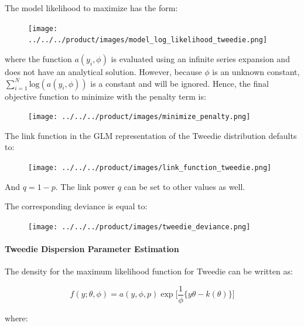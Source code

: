 The model likelihood to maximize has the form:

\begin{figure}[H]
\centering
\texttt{[image: ../../../product/images/model\_log\_likelihood\_tweedie.png]}
\end{figure}

where the function $a(y_i,\phi)$ is evaluated using an infinite series expansion and does not have an analytical solution. However, because $\phi$ is an unknown constant, $\sum_{i=1}^N\text{log}(a(y_i,\phi))$ is a constant and will be ignored. Hence, the final objective function to minimize with the penalty term is:

\begin{figure}[H]
\centering
\texttt{[image: ../../../product/images/minimize\_penalty.png]}
\end{figure}

The link function in the GLM representation of the Tweedie distribution defaults to:

\begin{figure}[H]
\centering
\texttt{[image: ../../../product/images/link\_function\_tweedie.png]}
\end{figure}

And $q = 1 - p$. The link power $q$ can be set to other values as well.

The corresponding deviance is equal to:

\begin{figure}[H]
\centering
\texttt{[image: ../../../product/images/tweedie\_deviance.png]}
\end{figure}


\paragraph{Tweedie Dispersion Parameter Estimation}

The density for the maximum likelihood function for Tweedie can be written as:

\begin{equation} \label{eq:1}
f( y; \theta, \phi) = a (y, \phi, p) \exp \Big[ \frac{1}{\phi} \big\{ y \theta - k(\theta) \big\} \Big]
\end{equation}

where:

